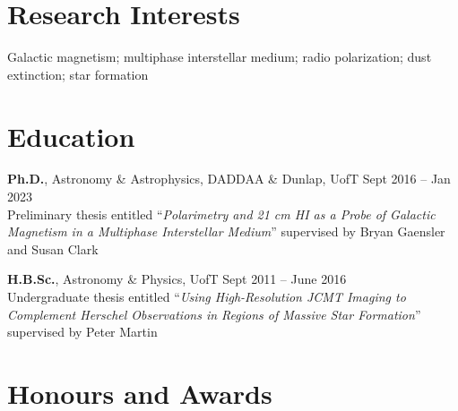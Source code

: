 \documentclass[10pt]{res} %
\begin{document}
\begin{resume}


\section{\Large Research Interests}
\vspace{-5pt} %
\noindent\makebox[\linewidth]{\rule{\textwidth}{0.4pt}}
\vspace{-20pt} %

Galactic magnetism; multiphase interstellar medium; radio polarization; dust extinction; star formation


\section{\Large Education}
\vspace{-5pt} %
\noindent\makebox[\linewidth]{\rule{\textwidth}{0.4pt}}
\vspace{-20pt} %

{\bf Ph.D.}, Astronomy \& Astrophysics, DADDAA \& Dunlap, UofT \hfill Sept 2016 -- Jan 2023 \\
Preliminary thesis entitled ``\textit{Polarimetry and 21 cm HI as a Probe of Galactic Magnetism in a Multiphase Interstellar Medium}'' supervised by Bryan Gaensler and Susan Clark

{\bf H.B.Sc.}, Astronomy \& Physics, UofT \hfill Sept 2011 -- June 2016 \\ 
Undergraduate thesis entitled ``\textit{Using High-Resolution JCMT Imaging to Complement Herschel Observations in Regions of Massive Star Formation}'' supervised by Peter Martin
 

\section{\Large Honours and Awards}
\vspace{-5pt} %
\noindent\makebox[\linewidth]{\rule{\textwidth}{0.4pt}}
\vspace{-20pt} %


\end{resume}
\end{document}
